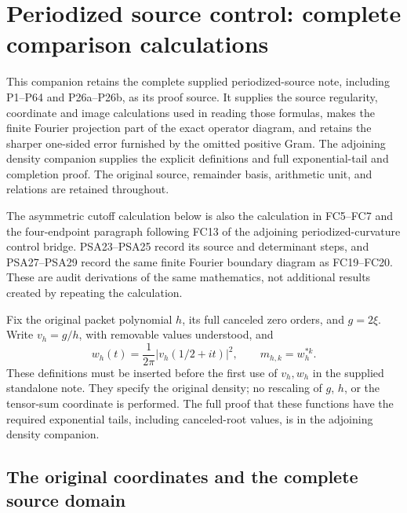 \documentclass{article}
\begin{document}
\maketitle
\section{Periodized source control: complete comparison calculations}
\label{sec:periodized-source-intake-proofs}

This companion retains the complete supplied periodized-source note,
including P1--P64 and P26a--P26b, as its proof source. It supplies the
source regularity, coordinate and image calculations used in reading
those formulas, makes the finite Fourier projection part of the exact
operator diagram, and retains the sharper one-sided error furnished by
the omitted positive Gram. The adjoining density companion supplies the
explicit definitions and full exponential-tail and completion proof.
The original source, remainder basis, arithmetic unit, and relations are
retained throughout.

The asymmetric cutoff calculation below is also the calculation in
FC5--FC7 and the four-endpoint paragraph following FC13 of the adjoining
periodized-curvature control bridge. PSA23--PSA25 record its source
and determinant steps, and PSA27--PSA29 record the same finite Fourier
boundary diagram as FC19--FC20. These
are audit derivations of the same mathematics, not additional results
created by repeating the calculation.

Fix the original packet polynomial $h$, its full canceled zero orders,
and $g=2\xi$. Write $v_h=g/h$, with removable values understood, and
\[
 w_h(t)=\frac{1}{2\pi}|v_h(1/2+it)|^2,
 \qquad m_{h,k}=w_h^{*k}.
 \tag{PSA1}
\]
These definitions must be inserted before the first use of $v_h,w_h$ in
the supplied standalone note. They specify the original density; no
rescaling of $g$, $h$, or the tensor-sum coordinate is performed. The
full proof that these functions have the required exponential tails,
including canceled-root values, is in the adjoining density companion.

\subsection{The original coordinates and the complete source domain}
\end{document}
